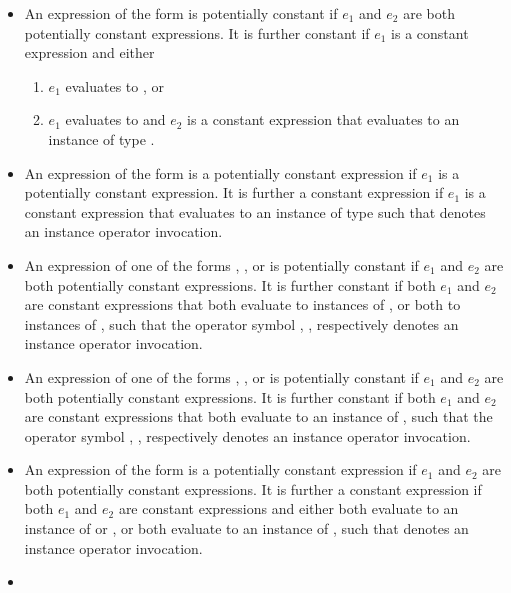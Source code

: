 \documentclass[makeidx]{article}
\begin{document}
{\begin{itemize}
\begin{enumerate}
  \end{enumerate}
\item
  An expression of the form  is
  potentially constant if $e_1$ and $e_2$
  are both potentially constant expressions.
  It is further constant if $e_1$ is a constant expression and either
  \begin{enumerate}
  \item $e_1$ evaluates to \TRUE, or
  \item $e_1$ evaluates to \FALSE{} and $e_2$ is a constant expression
    that evaluates to an instance of type .
  \end{enumerate}
\item
  An expression of the form  is
  a potentially constant expression
  if $e_1$ is a potentially constant expression.
  It is further a constant expression if $e_1$ is
  a constant expression that evaluates to an instance of type 
  such that \gtilde{} denotes an instance operator invocation.
\item
  An expression of one of the forms ,
  , or  is potentially constant
  if $e_1$ and $e_2$ are both potentially constant expressions.
  It is further constant if both $e_1$ and $e_2$ are constant expressions that
  both evaluate to instances of ,
  or both to instances of ,
  such that the operator symbol
  \lit{\&}, \lit{|}, respectively \lit{\^}
  denotes an instance operator invocation.
\item
  An expression of one of the forms
  , ,
  or  is potentially constant
  if $e_1$ and $e_2$ are both potentially constant expressions.
  It is further constant if both $e_1$ and $e_2$ are constant expressions that
  both evaluate to an instance of ,
  such that the operator symbol
  \lit{\gtgt}, \lit{\gtgtgt}, respectively \lit{\ltlt}
  denotes an instance operator invocation.
\item
  An expression of the form  is
  a potentially constant expression if $e_1$ and $e_2$
  are both potentially constant expressions.
  It is further a constant expression
  if both $e_1$ and $e_2$ are constant expressions
  and either both evaluate to an instance of  or ,
  or both evaluate to an instance of ,
  such that \lit{+} denotes an instance operator invocation.
\item

\end{itemize}}
\end{document}
